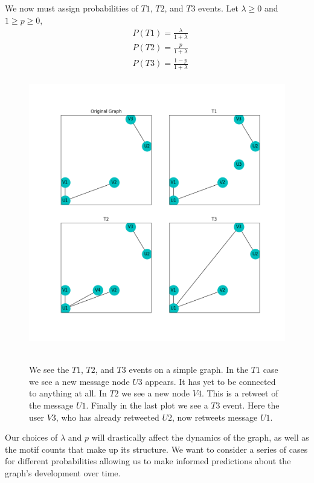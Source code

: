 We now must assign probabilities of $T1$, $T2$, and $T3$ events. Let $\lambda \geq 0$ and $1 \geq p \geq 0$,
\begin{align*}
    &P(T1) = \frac{\lambda}{1 + \lambda} \\
    &P(T2) = \frac{p}{1 + \lambda} \\
    &P(T3) = \frac{1-p}{1 + \lambda} \\
\end{align*}


\begin{figure}
    \includegraphics[width=12cm]{Images/events.png}\
    \centering
    \caption{We see the $T1$, $T2$, and $T3$ events on a simple graph. In the $T1$ case 
    we see a new message node $U3$ appears. It has yet to be connected to anything at all. In $T2$
    we see a new node $V4$. This is a retweet of the message $U1$. Finally in the last plot we see
    a $T3$ event. Here the user $V3$, who has already retweeted $U2$, now retweets message $U1$.}
\end{figure}

Our choices of $\lambda$ and $p$ will drastically affect the dynamics of the graph, as well as the motif counts that make
up its structure. We want to consider a series of cases for different probabilities allowing us to make informed predictions about the graph's development over time.


